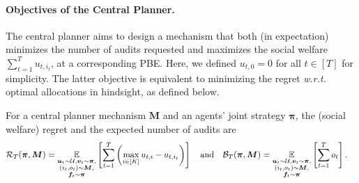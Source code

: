 \paragraph{Objectives of the Central Planner.} The central planner aims to design a mechanism that both (in expectation) minimizes the number of audits requested and maximizes the social welfare $\sum_{t=1}^T u_{t,i_t}$, at a corresponding PBE. Here, we defined $u_{t,0}=0$ for all $t\in [T]$ for simplicity. The latter objective is equivalent to minimizing the regret \textit{w.r.t.} optimal allocations in hindsight, as defined below.

\begin{definition}
For a central planner mechanism $\bm M$ and an agents' joint strategy $\bm\pi$, the (social welfare) regret and the expected number of audits are
\begin{align*}
\mathcal R_T(\bm \pi,\bm M)&= \E_{\substack{\bm u_{t}\sim \mV,\bm v_t\sim \bm \pi,\\(i_t,o_t)\sim \bm M,\\ \bm f_t\sim\bm\pi}}\sqb{\sum_{t=1}^T \left (\max_{i\in [K]} u_{t,i}-u_{t,i_t}\right )} \quad \text{and}\quad
\mathcal B_T(\bm \pi,\bm M)= \E_{\substack{\bm u_{t}\sim \mV,\bm v_t\sim \bm \pi,\\(i_t,o_t)\sim \bm M,\\ \bm f_t\sim\bm\pi}}\sqb{\sum_{t=1}^T o_t}.
\end{align*}
\end{definition}
